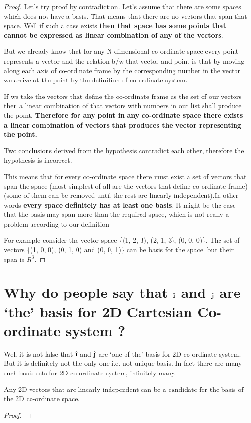 \documentclass[../main.tex]{subfiles}
\begin{document}
\begin{proof}
Let's try proof by contradiction.
Let's assume that there are some spaces which does not have a basis.
That means that there are no vectors that span that space.
Well if such a case exists \textbf{then that space has some points that cannot be expressed as linear combination of any of the vectors}.

But we already know that for any N dimensional co-ordinate space every point represents a vector and the relation b/w that vector and point is that by moving along each axis of co-ordinate frame by the corresponding number in the vector we arrive at the point by the definition of co-ordinate system.

If we take the vectors that define the co-ordinate frame as the set of our vectors then a linear combination of that vectors with numbers in our list shall produce the point.
\textbf{Therefore for any point in any co-ordinate space there exists a linear combination of vectors that produces the vector representing the point.}

Two conclusions derived from the hypothesis contradict each other, therefore the hypothesis is incorrect.

This means that for every co-ordinate space there must exist a set of vectors that span the space (most simplest of all are the vectors that define co-ordinate frame) (some of them can be removed until the rest are linearly independent).In other words \textbf{every space definitely has at least one basis}. It might be the case that the basis may span more than the required space, which is not really a problem according to our definition.

For example consider the vector space \{(1, 2, 3), (2, 1, 3), (0, 0, 0)\}. The set of vectors \{(1, 0, 0), (0, 1, 0) and (0, 0, 1)\} can be basis for the space, but their span is $ R^3 $.
\end{proof}

\section{Why do people say that $ \ihat $ and $ \jhat $ are `the' basis for 2D Cartesian Co-ordinate system ?}
Well it is not false that $ \ihat $ and $ \jhat $ are `one of the' basis for 2D co-ordinate system. But it is definitely not the only one i.e. not unique basis.
In fact there are many such basis sets for 2D co-ordinate system, infinitely many.

\begin{theorem}
Any 2D vectors that are linearly independent can be a candidate for the basis of the 2D co-ordinate space.
\end{theorem}

\begin{proof}
\end{proof}
\end{document}
